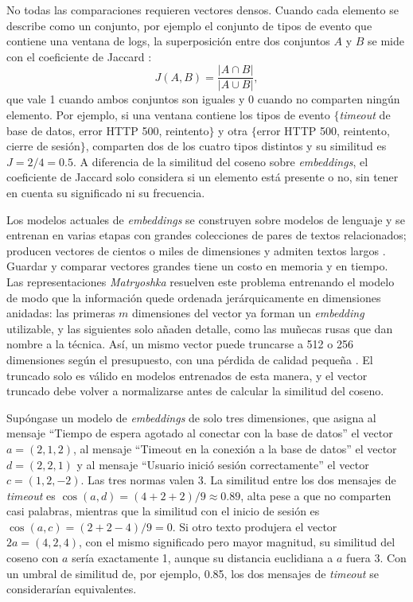 
No todas las comparaciones requieren vectores densos. Cuando cada elemento se describe como un conjunto, por ejemplo el conjunto de tipos de evento que contiene una ventana de logs, la superposición entre dos conjuntos $A$ y $B$ se mide con el coeficiente de Jaccard \cite{manning2008_ir}:
\begin{equation}
J(A, B) = \frac{|A \cap B|}{|A \cup B|},
\end{equation}
que vale 1 cuando ambos conjuntos son iguales y 0 cuando no comparten ningún elemento. Por ejemplo, si una ventana contiene los tipos de evento $\{$\textit{timeout} de base de datos, error HTTP 500, reintento$\}$ y otra $\{$error HTTP 500, reintento, cierre de sesión$\}$, comparten dos de los cuatro tipos distintos y su similitud es $J = 2/4 = 0.5$. A diferencia de la similitud del coseno sobre \textit{embeddings}, el coeficiente de Jaccard solo considera si un elemento está presente o no, sin tener en cuenta su significado ni su frecuencia.

Los modelos actuales de \textit{embeddings} se construyen sobre modelos de lenguaje y se entrenan en varias etapas con grandes colecciones de pares de textos relacionados; producen vectores de cientos o miles de dimensiones y admiten textos largos \cite{zhang2025_qwen3emb}. Guardar y comparar vectores grandes tiene un costo en memoria y en tiempo. Las representaciones \textit{Matryoshka} resuelven este problema entrenando el modelo de modo que la información quede ordenada jerárquicamente en dimensiones anidadas: las primeras $m$ dimensiones del vector ya forman un \textit{embedding} utilizable, y las siguientes solo añaden detalle, como las muñecas rusas que dan nombre a la técnica. Así, un mismo vector puede truncarse a 512 o 256 dimensiones según el presupuesto, con una pérdida de calidad pequeña \cite{kusupati2022_matryoshka}. El truncado solo es válido en modelos entrenados de esta manera, y el vector truncado debe volver a normalizarse antes de calcular la similitud del coseno.

Supóngase un modelo de \textit{embeddings} de solo tres dimensiones, que asigna al mensaje ``Tiempo de espera agotado al conectar con la base de datos'' el vector $a = (2, 1, 2)$, al mensaje ``Timeout en la conexión a la base de datos'' el vector $d = (2, 2, 1)$ y al mensaje ``Usuario inició sesión correctamente'' el vector $c = (1, 2, -2)$. Las tres normas valen 3. La similitud entre los dos mensajes de \textit{timeout} es $\cos(a, d) = (4 + 2 + 2)/9 \approx 0.89$, alta pese a que no comparten casi palabras, mientras que la similitud con el inicio de sesión es $\cos(a, c) = (2 + 2 - 4)/9 = 0$. Si otro texto produjera el vector $2a = (4, 2, 4)$, con el mismo significado pero mayor magnitud, su similitud del coseno con $a$ sería exactamente 1, aunque su distancia euclidiana a $a$ fuera 3. Con un umbral de similitud de, por ejemplo, 0.85, los dos mensajes de \textit{timeout} se considerarían equivalentes.

